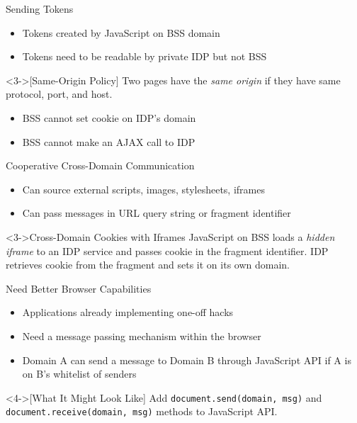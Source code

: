 \documentclass[handout]{beamer}
\begin{document}
\begin{frame}{Sending Tokens}
  \begin{itemize}
    \item<1-> Tokens created by JavaScript on BSS domain
    \item<2-> Tokens need to be readable by private IDP but not BSS
  \end{itemize}

  \begin{definition}<3->[Same-Origin Policy]
    Two pages have the \emph{same origin} if they have same protocol, port, and
    host.
  \end{definition}

  \begin{itemize}
    \item<4-> BSS cannot set cookie on IDP's domain
    \item<5-> BSS cannot make an AJAX call to IDP
  \end{itemize}
\end{frame}

\begin{frame}{Cooperative Cross-Domain Communication}
  \begin{itemize}
    \item<1-> Can source external scripts, images, stylesheets, iframes
    \item<2-> Can pass messages in URL query string or fragment identifier
  \end{itemize}

  \begin{alertblock}<3->{Cross-Domain Cookies with Iframes}
    JavaScript on BSS loads a \emph{hidden iframe} to an IDP service and passes
    cookie in the fragment identifier. IDP retrieves cookie from the fragment
    and sets it on its own domain.
  \end{alertblock}
\end{frame}

\begin{frame}{Need Better Browser Capabilities}
  \begin{itemize}
    \item<1-> Applications already implementing one-off hacks
    \item<2-> Need a message passing mechanism within the browser
    \item<3-> Domain A can send a message to Domain B through JavaScript API if
    A is on B's whitelist of senders
  \end{itemize}

  \begin{example}<4->[What It Might Look Like]
  Add \texttt{document.send(domain, msg)} and \texttt{document.receive(domain,
  msg)} methods to JavaScript API.
  \end{example}
\end{frame}
\end{document}
